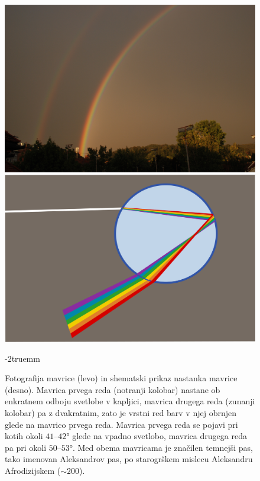 \begin{figure}[htp]
\centering
\includegraphics[width=7truecm]{slike/09_mavrica_photo.jpg}\hfill
\includegraphics[width=7truecm]{slike/09_mavrica_disp.png}
\caption{Fotografija mavrice (levo) in shematski prikaz nastanka
mavrice (desno). Mavrica prvega reda (notranji kolobar) nastane ob enkratnem
odboju svetlobe v kapljici, mavrica drugega reda (zunanji kolobar) pa z dvakratnim, 
zato je vrstni red barv v njej obrnjen glede na mavrico prvega reda. 
Mavrica prvega reda se pojavi pri 
kotih okoli $41$--$42\si{\degree}$ glede na vpadno svetlobo, mavrica drugega
reda pa pri okoli $50$--$53\si{\degree}$. Med obema mavricama je značilen 
temnejši pas, tako imenovan Aleksandrov pas, po starogrškem mislecu Aleksandru
Afrodizijskem ($\sim 200$).}
\label{fig:09_mavrica}
\vglue-2truemm
\end{figure}
